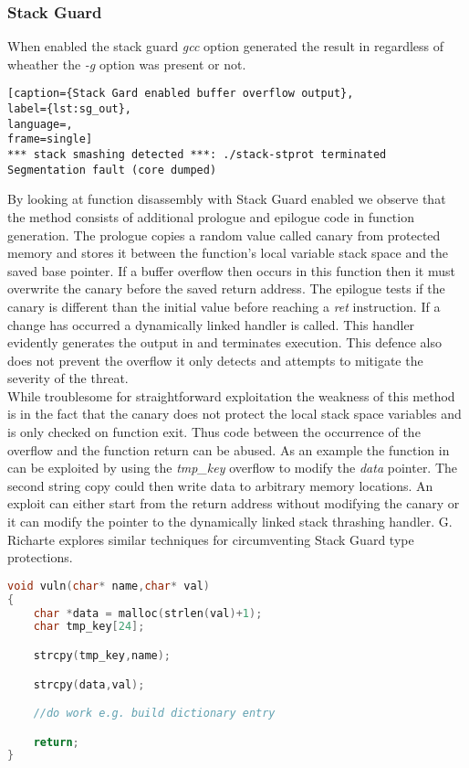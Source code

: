 \subsubsection {Stack Guard}
When enabled the stack guard \emph{gcc} option generated the result in  regardless of wheather the \emph{-g} option was present or not.

\begin{minipage}{\linewidth}
\begin{lstlisting}[caption={Stack Gard enabled buffer overflow output},
label={lst:sg_out},
language=,
frame=single]
*** stack smashing detected ***: ./stack-stprot terminated
Segmentation fault (core dumped)
\end{lstlisting}
\end{minipage}

By looking at function disassembly with Stack Guard enabled we observe that the method consists of additional prologue and epilogue code in function generation. The prologue copies a random value called canary from protected memory and stores it between the function's local variable stack space and the saved base pointer. If a buffer overflow then occurs in this function then it must overwrite the canary before the saved return address. The epilogue tests if the canary is different than the initial value before reaching a \emph{ret} instruction. If a change has occurred  a dynamically linked handler is called. This handler evidently generates the output in  and terminates execution. This defence also does not prevent the overflow it only detects and attempts to mitigate the severity of the threat.\\
While troublesome for straightforward exploitation the weakness of this method is in the fact that the canary does not protect the local stack space variables and is only checked on function exit. Thus code between the occurrence of the overflow and the function return can be abused. As an example the function in  can be exploited by using the \emph{tmp\_key} overflow to modify the \emph{data} pointer. The second string copy could then write data to arbitrary memory locations. An exploit can either start from the return address without modifying the canary or it can modify the pointer to the dynamically linked stack thrashing handler. G. Richarte\cite{Stackgua58} explores similar techniques for circumventing Stack Guard type protections.

\begin{minipage}{\linewidth}
\begin{lstlisting}[caption={Stack Gard vulnerable function},
label={lst:sg_example},
language=C,
frame=single]
void vuln(char* name,char* val)
{
    char *data = malloc(strlen(val)+1);
    char tmp_key[24];

    strcpy(tmp_key,name);

    strcpy(data,val);

    //do work e.g. build dictionary entry

    return;
}
\end{lstlisting}
\end{minipage}


